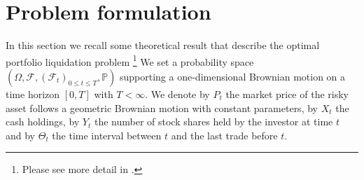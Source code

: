 \documentclass[a4paper,10pt]{article}
\begin{document}
\section{Problem formulation}
In this section we recall some theoretical result that describe the optimal portfolio liquidation problem \footnote{Please see more detail in \cite{KP}.} We set a probability space $\left(\Omega,\mathcal{F}, \left(\mathcal{F}_t\right)_{0\le t\le T}, \mathbb{P}\right)$ supporting a one-dimensional Brownian motion on a time horizon $[0, T]$ with $T < \infty$. We denote by $P_t$
the market price of the risky asset follows a geometric Brownian motion with constant parameters, by $X_t$ the cash holdings, by $Y_t$ the number of stock shares held by the investor at time $t$ and by $\Theta_t$ the time interval between $t$ and the last trade before $t$. 
\end{document}
